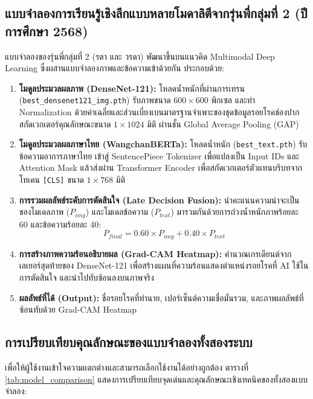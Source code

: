 \subsection{แบบจำลองการเรียนรู้เชิงลึกแบบหลายโมดาลิตีจากรุ่นพี่กลุ่มที่ 2 (ปีการศึกษา 2568)}
แบบจำลองของรุ่นพี่กลุ่มที่ 2 (รตา และ วรดา) \cite{unnahasarakhon2025multimodal} พัฒนาขึ้นบนแนวคิด Multimodal Deep Learning ซึ่งผสานแบบจำลองภาพและข้อความเข้าด้วยกัน ประกอบด้วย:
\begin{enumerate}
    \item \textbf{โมดูลประมวลผลภาพ (DenseNet-121):} โหลดน้ำหนักที่ผ่านการเทรน (\texttt{best\_densenet121\_img.pth}) รับภาพขนาด $600 \times 600$ พิกเซล และทำ Normalization ด้วยค่าเฉลี่ยและส่วนเบี่ยงเบนมาตรฐานจำเพาะของชุดข้อมูลรอยโรคช่องปาก สกัดเวกเตอร์คุณลักษณะขนาด $1 \times 1024$ มิติ ผ่านชั้น Global Average Pooling (GAP)
    \item \textbf{โมดูลประมวลผลภาษาไทย (WangchanBERTa):} โหลดน้ำหนัก (\texttt{best\_text.pth}) รับข้อความอาการภาษาไทย เข้าสู่ SentencePiece Tokenizer เพื่อแปลงเป็น Input IDs และ Attention Mask แล้วส่งผ่าน Transformer Encoder เพื่อสกัดเวกเตอร์ตัวแทนบริบทจากโทเคน \texttt{[CLS]} ขนาด $1 \times 768$ มิติ
    \item \textbf{การรวมผลลัพธ์ระดับการตัดสินใจ (Late Decision Fusion):} นำคะแนนความน่าจะเป็นของโมเดลภาพ ($P_{img}$) และโมเดลข้อความ ($P_{text}$) มารวมกันด้วยการถ่วงน้ำหนักภาพร้อยละ 60 และข้อความร้อยละ 40:
    \begin{equation}
        P_{final} = 0.60 \times P_{img} + 0.40 \times P_{text}
        \label{eq:ch3_late_fusion}
    \end{equation}
    \item \textbf{การสร้างภาพความร้อนอธิบายผล (Grad-CAM Heatmap):} คำนวณเกรเดียนต์จากเลเยอร์สุดท้ายของ DenseNet-121 เพื่อสร้างแผนที่ความร้อนแสดงตำแหน่งรอยโรคที่ AI ใช้ในการตัดสินใจ และนำไปทับซ้อนลงบนภาพจริง
    \item \textbf{ผลลัพธ์ที่ได้ (Output):} ชื่อรอยโรคที่ทำนาย, เปอร์เซ็นต์ความเชื่อมั่นรวม, และภาพผลลัพธ์ที่ซ้อนทับด้วย Grad-CAM Heatmap
\end{enumerate}

\subsection{การเปรียบเทียบคุณลักษณะของแบบจำลองทั้งสองระบบ}
เพื่อให้ผู้ใช้งานเข้าใจความแตกต่างและสามารถเลือกใช้งานได้อย่างถูกต้อง ตารางที่ \ref{tab:model_comparison} แสดงการเปรียบเทียบจุดเด่นและคุณลักษณะเชิงเทคนิคของทั้งสองแบบจำลอง:

